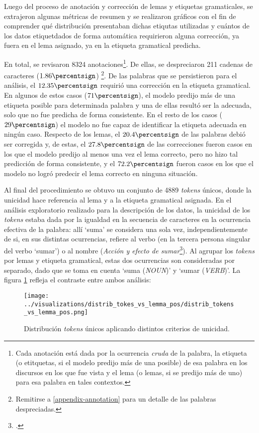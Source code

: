 Luego del proceso de anotación y corrección de lemas y etiquetas gramaticales,
se extrajeron algunas métricas de resumen y se realizaron gráficos con el fin de
comprender qué distribución presentaban dichas etiqutas utilizadas y cuántos de los
datos etiquetdados de forma automática requirieron alguna corrección, ya fuera en el
lema asignado, ya en la etiqueta gramatical predicha.
\par
En total, se revisaron 8324 anotaciones\footnote{Cada anotación está dada por
la ocurrencia \textit{cruda} de la palabra, la etiqueta (o etitquetas, si el modelo
predijo más de una posible) de esa palabra en los discursos en los que fue vista y el
lema (o lemas, si se predijo más de uno) para esa palabra en tales contextos.}.
De ellas, se despreciaron 211 cadenas de caracteres ($1.86\percentsign$)
\footnote{Remitirse a \ref{appendix-annotation} para un detalle de las palabras
despreciadas.}. De las palabras que se persistieron para el análisis,
el $12.35\percentsign$ requirió una corrección en la etiqueta gramatical.
En algunos de estos casos ($71\percentsign$), el modelo predijo más de una etiqueta
posible para determinada palabra y una de ellas resultó ser la adecuada, solo que no
fue predicha de forma consistente. En el resto de los casos ($29\percentsign$)
el modelo no fue capaz de identificar la etiqueta adecuada en ningún caso.
Respecto de los lemas, el $20.4\percentsign$ de las palabras debió ser corregida
y, de estas, el $27.8\percentsign$ de las correcciones fueron casos en los que el
modelo predijo al menos una vez el lema correcto, pero no hizo tal predicción de
forma consistente, y el $72.2\percentsign$ fueron casos en los que el modelo
no logró predecir el lema correcto en ninguna situación.
\par
Al final del procedimiento se obtuvo un conjunto de 4889 \textit{tokens} únicos,
donde la unicidad hace referencia al lema y a la etiqueta gramatical asignada.
En el análisis exploratorio realizado para la descripción de los datos, la unicidad
de los \textit{tokens} estaba dada por la igualdad en la secuencia de caracteres
en la ocurrencia efectiva de la palabra: allí `suma' se considera
una sola vez, independientemente de si, en sus distintas ocurrencias, refiere al
verbo (en la tercera persona singular del verbo `sumar') o al nombre
(\textit{Acción y efecto de sumar}\footnote{.}). Al
agrupar los \textit{tokens} por lemas y etiqueta gramatical, estas dos
ocurrencias son consideradas por separado, dado que se toma en cuenta
`suma (\textit{NOUN})' y `sumar (\textit{VERB})'. La figura
\ref{fig-distrib-unique-tokens} refleja el contraste entre ambos análisis:

\begin{figure}[h!]
\centering
\texttt{[image: ../visualizations/distrib\_tokes\_vs\_lemma\_pos/distrib\_tokens\_vs\_lemma\_pos.png]}
\caption{Distribución \textit{tokens} únicos aplicando distintos criterios de unicidad.}
\label{fig-distrib-unique-tokens}
\end{figure}